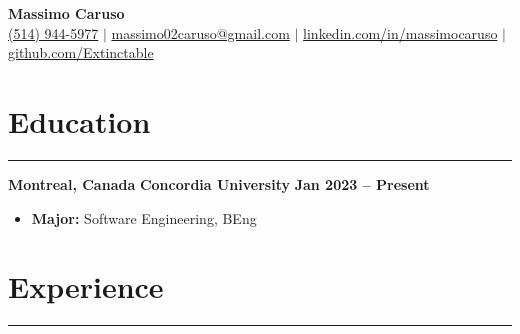 \documentclass[10pt]{article}
\begin{document}
\newcommand{\fullname}{Massimo Caruso}
\newcommand{\phone}{(514) 944-5977}
\newcommand{\email}{massimo02caruso@gmail.com}
\newcommand{\linkedin}{linkedin.com/in/massimocaruso}
\newcommand{\github}{github.com/Extinctable}

\begin{center}
    {\Huge \textbf{\fullname}} \\
    \vspace{1mm}
    {\small 
    \faPhone \hspace{0mm} \href{tel:+15149445977}{\phone} $\vert$ 
    \faEnvelope \hspace{0mm} \href{mailto:massimo02caruso@gmail.com}{\email} $\vert$ 
    \faLinkedin \hspace{0mm} \href{https://linkedin.com/in/massimocaruso}{\linkedin} $\vert$ 
    \faGithub \hspace{0mm} \href{https://github.com/Extinctable}{\github}
    }
\end{center}

\vspace{-8mm}

\section*{Education}
\vspace{-2mm}
\hrule
\vspace{0mm}

\textbf{Montreal, Canada} \hfill \textbf{Concordia University} \hfill \textbf{Jan 2023 -- Present} 
\vspace{-4mm}
\begin{itemize}[left=0.15in, itemsep=0pt]
    \item \textbf{Major:} Software Engineering, BEng
\end{itemize}

\section*{Experience}
\vspace{-2mm}
\hrule
\vspace{0mm}
\end{document}
